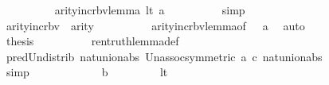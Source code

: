 \begin{isabellebody}
\ \ \ \ \ \ \ \ \isamarkupfalse%
\ arity{\isacharunderscore}{\kern0pt}incr{\isacharunderscore}{\kern0pt}bv{\isacharunderscore}{\kern0pt}lemma\ lt\ a\isanewline
\ \ \ \ \ \ \ \ \isamarkupfalse%
\ simp\isanewline
\ \ \ \ \ \ \isamarkupfalse%
\ {\isacartoucheopen}{\isasymphi}{\isasymin}{\isacharunderscore}{\kern0pt}{\isacartoucheclose}\isanewline
\ \ \ \ \ \ \isamarkupfalse%
\ {\isachardoublequoteopen}arity{\isacharparenleft}{\kern0pt}incr{\isacharunderscore}{\kern0pt}bv{\isacharparenleft}{\kern0pt}{\isacharquery}{\kern0pt}{\isasymphi}{\isacharprime}{\kern0pt}{\isacharparenright}{\kern0pt}{\isacharbackquote}{\kern0pt}{}{\isacharparenright}{\kern0pt}\ {\isacharequal}{\kern0pt}\ {}{\isacharhash}{\kern0pt}{\isacharplus}{\kern0pt}arity{\isacharparenleft}{\kern0pt}{\isasymphi}{\isacharparenright}{\kern0pt}{\isachardoublequoteclose}\isanewline
\ \ \ \ \ \ \ \ \isamarkupfalse%
\ arity{\isacharunderscore}{\kern0pt}incr{\isacharunderscore}{\kern0pt}bv{\isacharunderscore}{\kern0pt}lemma{\isacharbrackleft}{\kern0pt}of\ {\isacharquery}{\kern0pt}{\isasymphi}{\isacharprime}{\kern0pt}\ {}{\isacharbrackright}{\kern0pt}\ a\ \isamarkupfalse%
\ auto\isanewline
\ \ \ \ \ \ \isamarkupfalse%
\ {\isacartoucheopen}{\isasymphi}{\isasymin}{\isacharunderscore}{\kern0pt}{\isacartoucheclose}\isanewline
\ \ \ \ \ \ \isamarkupfalse%
\ {\isacharquery}{\kern0pt}thesis\isanewline
\ \ \ \ \ \ \ \ \isamarkupfalse%
\ ren{\isacharunderscore}{\kern0pt}truth{\isacharunderscore}{\kern0pt}lemma{\isacharunderscore}{\kern0pt}def\isanewline
\ \ \ \ \ \ \ \ \isamarkupfalse%
\ pred{\isacharunderscore}{\kern0pt}Un{\isacharunderscore}{\kern0pt}distrib\ nat{\isacharunderscore}{\kern0pt}union{\isacharunderscore}{\kern0pt}abs{}\ Un{\isacharunderscore}{\kern0pt}assoc{\isacharbrackleft}{\kern0pt}symmetric{\isacharbrackright}{\kern0pt}\ a\ c\ nat{\isacharunderscore}{\kern0pt}union{\isacharunderscore}{\kern0pt}abs{}\isanewline
\ \ \ \ \ \ \ \ \isamarkupfalse%
\ simp\isanewline
\ \ \ \ \isamarkupfalse%
\isanewline
\ \ \ \ \ \ \isamarkupfalse%
\ b\isanewline
\ \ \ \ \ \ \isamarkupfalse%
\ {\isacartoucheopen}{\isasymphi}{\isasymin}{\isacharunderscore}{\kern0pt}{\isacartoucheclose}\ lt\isanewline
\ \ \ \ \ \ \isamarkupfalse%

\end{isabellebody}
